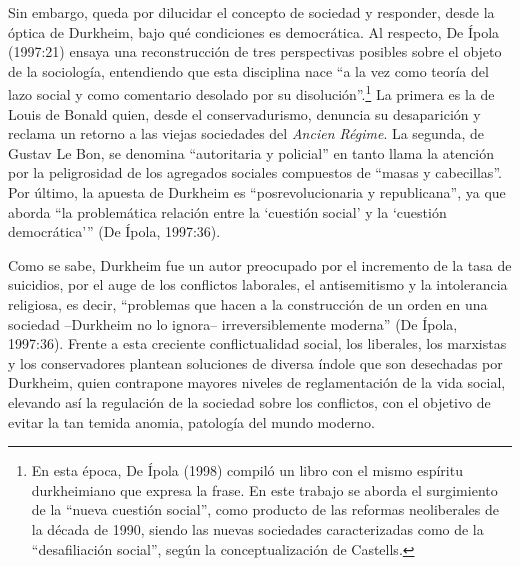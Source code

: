 Sin embargo, queda por dilucidar el concepto de sociedad y responder, desde la óptica de Durkheim, bajo qué condiciones es democrática. Al respecto, De Ípola (1997:21) ensaya una reconstrucción de tres perspectivas posibles sobre el objeto de la sociología, entendiendo que esta disciplina nace \enquote{a la vez como teoría del lazo social y como comentario desolado por su disolución}.\footnote{En esta época, De Ípola (1998) compiló un libro con el mismo espíritu durkheimiano que expresa la frase. En este trabajo se aborda el surgimiento de la \enquote{nueva cuestión social}, como producto de las reformas neoliberales de la década de 1990, siendo las nuevas sociedades caracterizadas como de la \enquote{desafiliación social}, según la conceptualización de Castells.} La primera es la de Louis de Bonald quien, desde el conservadurismo, denuncia su desaparición y reclama un retorno a las viejas sociedades del \emph{Ancien Régime}. La segunda, de Gustav Le Bon, se denomina \enquote{autoritaria y policial} en tanto llama la atención por la peligrosidad de los agregados sociales compuestos de \enquote{masas y cabecillas}. Por último, la apuesta de Durkheim es \enquote{posrevolucionaria y republicana}, ya que aborda \enquote{la problemática relación entre la \enquote{cuestión social} y la \enquote{cuestión democrática}} (De Ípola, 1997:36).

Como se sabe, Durkheim fue un autor preocupado por el incremento de la tasa de suicidios, por el auge de los conflictos laborales, el antisemitismo y la intolerancia religiosa, es decir, \enquote{problemas que hacen a la construcción de un orden en una sociedad --Durkheim no lo ignora-- irreversiblemente moderna} (De Ípola, 1997:36). Frente a esta creciente conflictualidad social, los liberales, los marxistas y los conservadores plantean soluciones de diversa índole que son desechadas por Durkheim, quien contrapone mayores niveles de reglamentación de la vida social, elevando así la regulación de la sociedad sobre los conflictos, con el objetivo de evitar la tan temida anomia, patología del mundo moderno.

